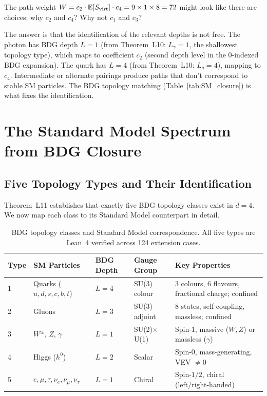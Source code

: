 \documentclass[12pt,a4paper]{article}
\begin{document}
The path weight $W=c_2\cdot\mathbb{E}[S_{\rm virt}]\cdot c_4=9\times1\times8=72$ might look like there are choices: why $c_2$ and $c_4$?  Why not $c_1$ and $c_3$?

The answer is that the identification of the relevant depths is not free.  The photon has BDG depth $L=1$ (from Theorem~L10: $L_\gamma=1$, the shallowest topology type), which maps to coefficient $c_2$ (second depth level in the 0-indexed BDG expansion).  The quark has $L=4$ (from Theorem~L10: $L_q=4$), mapping to $c_4$.  Intermediate or alternate pairings produce paths that don't correspond to stable SM particles.  The BDG topology matching (Table~\ref{tab:SM_closure}) is what fixes the identification.

\section{The Standard Model Spectrum from BDG Closure}\label{sec:SM}

\subsection{Five Topology Types and Their Identification}

Theorem~L11 establishes that exactly five BDG topology classes exist in $d=4$.  We now map each class to its Standard Model counterpart in detail.

\begin{table}[ht]
\centering
\caption{BDG topology classes and Standard Model correspondence.  All five types are Lean~4 verified across 124 extension cases.}
\label{tab:SM_full}
\begin{tabular}{p{0.4cm}p{2.5cm}p{1.5cm}p{2.5cm}p{5cm}}
\toprule
Type & SM Particles & BDG Depth & Gauge Group & Key Properties \\
\midrule
1 & Quarks ($u,d,s,c,b,t$) & $L=4$ & SU(3) colour & 3 colours, 6 flavours, fractional charge; confined \\
2 & Gluons & $L=3$ & SU(3) adjoint & 8 states, self-coupling, massless; confined \\
3 & $W^\pm$, $Z$, $\gamma$ & $L=1$ & SU(2)$\times$U(1) & Spin-1, massive ($W,Z$) or massless ($\gamma$) \\
4 & Higgs ($h^0$) & $L=2$ & Scalar & Spin-0, mass-generating, VEV $\neq0$ \\
5 & $e,\mu,\tau,\nu_e,\nu_\mu,\nu_\tau$ & $L=1$ & Chiral & Spin-$1/2$, chiral (left/right-handed) \\
\bottomrule
\end{tabular}
\end{table}
\end{document}
